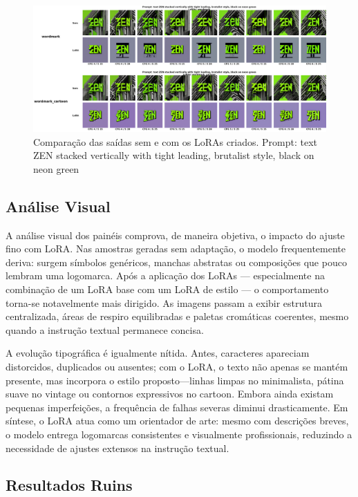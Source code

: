 \documentclass[12pt, %
openright, 
oneside, %
a4paper,    %
brazil]{facom-ufu-abntex2}
\begin{document}
\begin{figure}[H]
    \centering
    \includegraphics[width=1.0\linewidth]{figuras/resultados/good/wordmark/cmp_p5_batch1.png}
    \caption[10º Comparação das saídas sem e com os LoRAs criados.]{Comparação das saídas sem e com os LoRAs criados. Prompt: text ZEN stacked vertically with tight leading, brutalist style, black on neon green}
    \label{fig:wordmarkCmpP5Batch1}
\end{figure}

\subsection{Análise Visual}

A análise visual dos painéis comprova, de maneira objetiva, o impacto do ajuste fino com LoRA. Nas amostras geradas sem adaptação, o modelo frequentemente deriva: surgem símbolos genéricos, manchas abstratas ou composições que pouco lembram uma logomarca. Após a aplicação dos LoRAs — especialmente na combinação de um LoRA base com um LoRA de estilo — o comportamento torna-se notavelmente mais dirigido. As imagens passam a exibir estrutura centralizada, áreas de respiro equilibradas e paletas cromáticas coerentes, mesmo quando a instrução textual permanece concisa.

A evolução tipográfica é igualmente nítida. Antes, caracteres apareciam distorcidos, duplicados ou ausentes; com o LoRA, o texto não apenas se mantém presente, mas incorpora o estilo proposto—linhas limpas no minimalista, pátina suave no vintage ou contornos expressivos no cartoon. Embora ainda existam pequenas imperfeições, a frequência de falhas severas diminui drasticamente. Em síntese, o LoRA atua como um orientador de arte: mesmo com descrições breves, o modelo entrega logomarcas consistentes e visualmente profissionais, reduzindo a necessidade de ajustes extensos na instrução textual.

\subsection{Resultados Ruins}
\end{document}

